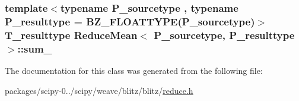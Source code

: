 \subsubsection[{sum\+\_\+}]{\setlength{\rightskip}{0pt plus 5cm}template$<$typename P\+\_\+sourcetype , typename P\+\_\+resulttype  = B\+Z\+\_\+\+F\+L\+O\+A\+T\+T\+Y\+P\+E(\+P\+\_\+sourcetype)$>$ {\bf T\+\_\+resulttype} {\bf Reduce\+Mean}$<$ P\+\_\+sourcetype, P\+\_\+resulttype $>$\+::sum\+\_\+\hspace{0.3cm}{\ttfamily [protected]}}\label{classReduceMean_a27a3d360fad5c0108687d90e42fa9326}


The documentation for this class was generated from the following file\+:\begin{DoxyCompactItemize}
\item 
packages/scipy-\/0../scipy/weave/blitz/blitz/\hyperlink{reduce_8h}{reduce.\+h}\end{DoxyCompactItemize}
